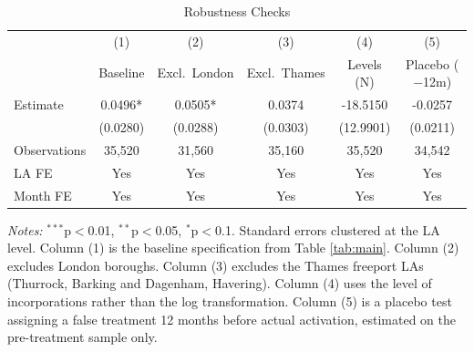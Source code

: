 \begin{table}[htbp]
\centering
\caption{Robustness Checks}
\label{tab:robustness}
\begin{tabular}{lccccc}
\hline\hline
 & (1) & (2) & (3) & (4) & (5) \\
 & Baseline & Excl.\ London & Excl.\ Thames & Levels (N) & Placebo ($-$12m) \\
\hline
Estimate & 0.0496* & 0.0505* & 0.0374 & -18.5150 & -0.0257 \\
 & (0.0280) & (0.0288) & (0.0303) & (12.9901) & (0.0211) \\
\hline
Observations & 35,520 & 31,560 & 35,160 & 35,520 & 34,542 \\
LA FE & Yes & Yes & Yes & Yes & Yes \\
Month FE & Yes & Yes & Yes & Yes & Yes \\
\hline\hline
\end{tabular}
\begin{tablenotes}[flushleft]
\small
\item \textit{Notes:} $^{***}$p$<$0.01, $^{**}$p$<$0.05, $^{*}$p$<$0.1. Standard errors clustered at the LA level. Column (1) is the baseline specification from Table \ref{tab:main}. Column (2) excludes London boroughs. Column (3) excludes the Thames freeport LAs (Thurrock, Barking and Dagenham, Havering). Column (4) uses the level of incorporations rather than the log transformation. Column (5) is a placebo test assigning a false treatment 12 months before actual activation, estimated on the pre-treatment sample only.
\end{tablenotes}
\end{table}
